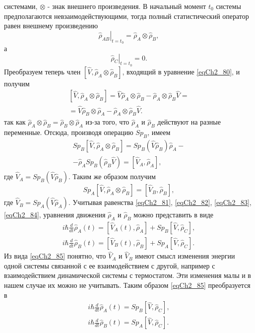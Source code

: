 системами, $\otimes$ - знак внешнего произведения. В начальный момент $t_0$
системы предполагаются  невзаимодействующими, тогда полный
статистический оператор равен внешнему произведению 
\[
\left.\hat{\rho}_{AB}\right|_{t = t_0} = \hat{\rho}_{A} \otimes \hat{\rho}_{B},
\] 
а 
\[
\left.\hat{\rho}_{C}\right|_{t = t_0} = 0.
\] 
Преобразуем теперь член 
$\left[\hat{V}, \hat{\rho}_{A} \otimes \hat{\rho}_{B}\right]$,
входящий в уравнение \eqref{eqCh2_80}, и получим  
\begin{eqnarray}
\left[\hat{V}, \hat{\rho}_{A} \otimes \hat{\rho}_{B}\right] = 
\hat{V}  \hat{\rho}_{A} \otimes \hat{\rho}_{B} - 
\hat{\rho}_{A} \otimes \hat{\rho}_{B} \hat{V} = 
\nonumber \\
= \hat{V}  \hat{\rho}_{B} \otimes \hat{\rho}_{A} - 
\hat{\rho}_{A} \otimes \hat{\rho}_{B} \hat{V}.
\label{eqCh2_82}
\end{eqnarray}
так как 
\(
\hat{\rho}_{A} \otimes \hat{\rho}_{B} = 
\hat{\rho}_{B} \otimes \hat{\rho}_{A}
\)   из-за того, что  $\hat{\rho}_{A}$ и $\hat{\rho}_{B}$ действуют на
разные  переменные. Отсюда, производя операцию $Sp_B$, имеем 
\begin{eqnarray}
Sp_B \left[\hat{V}, \hat{\rho}_{A} \otimes \hat{\rho}_{B}\right] = 
Sp_B\left(\hat{V} \hat{\rho}_{B}\right) \hat{\rho}_{A} - 
\nonumber \\
-
\hat{\rho}_{A} Sp_B \left(\hat{\rho}_{B} \hat{V}\right) = 
\left[\hat{V}_A, \hat{\rho}_A\right],
\label{eqCh2_83}
\end{eqnarray}
где $\hat{V}_A = Sp_B\left(\hat{V}\hat{\rho}_B\right)$. Таким же
образом получим 
\begin{equation}
Sp_A \left[\hat{V}, \hat{\rho}_{A} \otimes \hat{\rho}_{B}\right] =
\left[\hat{V}_B, \hat{\rho}_B\right],
\label{eqCh2_84}
\end{equation}
где $\hat{V}_B= Sp_A\left(\hat{V}\hat{\rho}_A\right)$.  
Учитывая равенства \eqref{eqCh2_81}, \eqref{eqCh2_82},
\eqref{eqCh2_83}, \eqref{eqCh2_84}, уравнения движения 
$\hat{\rho}_{A}$ и $\hat{\rho}_{B}$ можно представить в виде  
\begin{eqnarray}
i\hbar\frac{d}{d t} \hat{\rho}_A\left(t\right) = 
\left[\hat{V}_A\left(t\right), \hat{\rho}_A\right] +
Sp_B \left[\hat{V}, \hat{\rho}_C\right],
\nonumber \\
i\hbar\frac{d}{d t} \hat{\rho}_B\left(t\right) = 
\left[\hat{V}_B\left(t\right), \hat{\rho}_B\right] +
Sp_A \left[\hat{V}, \hat{\rho}_C\right].
\label{eqCh2_85}
\end{eqnarray}
Из вида \eqref{eqCh2_85} понятно, что $\hat{V}_A$ и $\hat{V}_B$ имеют
смысл изменения энергии одной системы связанной с ее взаимодействием с
другой, например с взаимодействием динамической системы с
термостатом. Эти изменения малы и в нашем случае их можно не
учитывать. Таким образом \eqref{eqCh2_85} преобразуется в 
\begin{eqnarray}
i\hbar\frac{d}{d t} \hat{\rho}_A\left(t\right) = 
Sp_B \left[\hat{V}, \hat{\rho}_C\right],
\nonumber \\
i\hbar\frac{d}{d t} \hat{\rho}_B\left(t\right) = 
Sp_A \left[\hat{V}, \hat{\rho}_C\right].
\label{eqCh2_85a}
\end{eqnarray}

